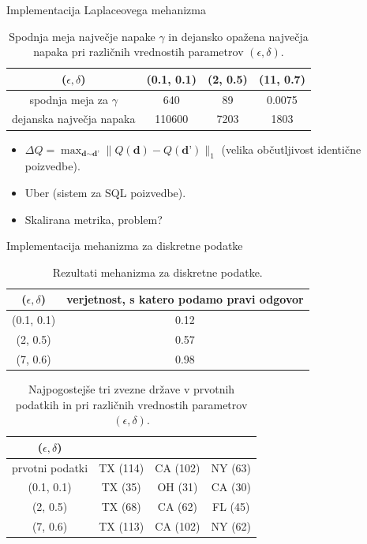 \documentclass{beamer}
\begin{document}
\begin{frame}{Implementacija Laplaceovega mehanizma}
\begin{table}[h]
\begin{center}
 \begin{tabular}{| c | c | c | c |} 
 \hline
($\epsilon, \delta$) & (0.1, 0.1) & (2, 0.5) & (11, 0.7)  \\ [0.5ex] 
 \hline
 spodnja meja za $\gamma$ & 640 & 89 & 0.0075  \\ 
 \hline
 dejanska največja napaka & 110600 & 7203 & 1803\\
 \hline
\end{tabular}
\caption{Spodnja meja največje napake $\gamma$ in dejansko opažena največja napaka pri različnih vrednostih parametrov $(\epsilon, \delta)$. }
\end{center}
\end{table}
\begin{itemize}
\item $\Delta Q = \max_{\textbf{d} \sim \textbf{d'}} \| Q(\textbf{d}) - Q(\textbf{d'}) \|_1$ (velika občutljivost identične poizvedbe).
\item Uber (sistem za SQL poizvedbe).
\item Skalirana metrika, problem?
\end{itemize}
\end{frame}
\begin{frame}{Implementacija mehanizma za diskretne podatke}
\begin{table}[!htb]
\begin{center}
 \begin{tabular}{| c | c | } 
 \hline
($\epsilon, \delta$) & verjetnost, s katero podamo pravi odgovor  \\ [0.5ex] 
 \hline
(0.1, 0.1) & 0.12  \\ 
 \hline
 (2, 0.5) & 0.57  \\ 
 \hline
 (7, 0.6) & 0.98  \\ 
 \hline
\end{tabular}
\caption{Rezultati mehanizma za diskretne podatke. }
\end{center}
\end{table}
\begin{table}[!htb]
\begin{center}
 \begin{tabular}{| c | c | c | c|} 
 \hline
($\epsilon, \delta$) & & &  \\ [0.5ex] 
 \hline
prvotni podatki & TX (114) & CA (102) & NY (63)  \\ 
 \hline
(0.1, 0.1) & TX (35) & OH (31) & CA (30)  \\ 
 \hline
(2, 0.5) & TX (68) & CA (62) & FL (45)  \\ 
 \hline
(7, 0.6) & TX (113) & CA (102) & NY (62)  \\ 
 \hline
\end{tabular}
\caption{Najpogostejše tri zvezne države v prvotnih podatkih in pri različnih vrednostih parametrov $(\epsilon, \delta)$. }
\end{center}
\end{table}
\end{frame}
\end{document}
